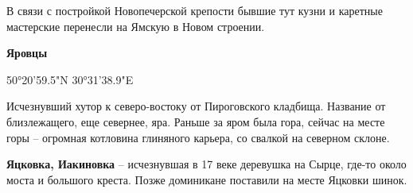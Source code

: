 В связи с постройкой Новопечерской крепости бывшие тут кузни и каретные мастерские перенесли на Ямскую в Новом строении.\\

\medskip

\textbf{Яровцы} 

50°20'59.5"N 30°31'38.9"E

Исчезнувший хутор к северо-востоку от Пироговского кладбища. Название от близлежащего, еще севернее, яра. Раньше за яром была гора, сейчас на месте горы – огромная котловина глиняного карьера, со свалкой на северном склоне.\\

\medskip

\textbf{Яцковка, Иакиновка} – исчезнувшая в 17 веке деревушка на Сырце, где-то около моста и большого креста. Позже доминикане поставили на месте Яцковки шинок.